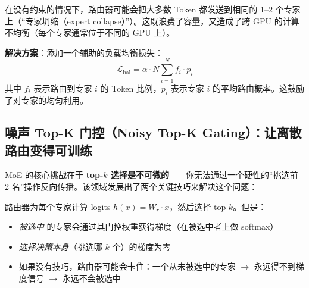 \begin{warningbox}[负载均衡问题]
在没有约束的情况下，路由器可能会把大多数 Token 都发送到相同的 1--2 个专家上（“专家坍缩（expert collapse）”）。这既浪费了容量，又造成了跨 GPU 的计算不均衡（每个专家通常位于不同的 GPU 上）。

\textbf{解决方案}：添加一个辅助的负载均衡损失：
\[
\mathcal{L}_{\text{bal}} = \alpha \cdot N \sum_{i=1}^{N} f_i \cdot p_i
\]
其中 $f_i$ 表示路由到专家 $i$ 的 Token 比例，$p_i$ 表示专家 $i$ 的平均路由概率。这鼓励了对专家的均匀利用。
\end{warningbox}

\subsection{噪声 Top-K 门控（Noisy Top-K Gating）：让离散路由变得可训练}
\label{noisy-top-k-gating-making-discrete-routing-trainable}

MoE 的核心挑战在于 \textbf{top-$k$ 选择是不可微的}——你无法通过一个硬性的“挑选前 2 名”操作反向传播。该领域发展出了两个关键技巧来解决这个问题：

\begin{intuitionbox}[路由可微性问题]
路由器为每个专家计算 logits $h(x) = W_r \cdot x$，然后选择 top-$k$。但是：

\begin{itemize}
  \item \emph{被选中} 的专家会通过其门控权重获得梯度（在被选中者上做 softmax）
  \item \emph{选择决策本身}（挑选哪 $k$ 个）的梯度为零
  \item 如果没有技巧，路由器可能会卡住：一个从未被选中的专家 $\rightarrow$ 永远得不到梯度信号 $\rightarrow$ 永远不会被选中
\end{itemize}
\end{intuitionbox}

